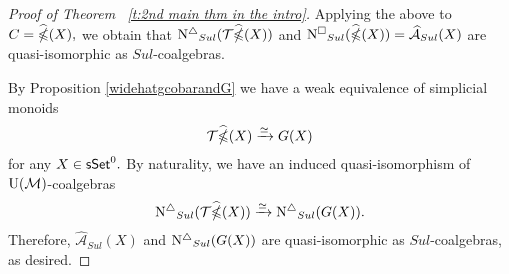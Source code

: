 \begin{proof}[Proof of Theorem ~\ref{t:2nd main thm in the intro}]
Applying the above to $C= \widehat{\operatorname{\mathbb{\Omega}}}(X),$ we obtain that $\operatorname{N^{\triangle}}_{Sul} (\mathcal{T} \widehat{\operatorname{\mathbb{\Omega}}}(X))$ and $\operatorname{N^{\square}}_{Sul}(\widehat{\operatorname{\mathbb{\Omega}}}(X)) = \widehat{\mathcal{A}}_{Sul}(X)$ are quasi-isomorphic as $Sul$-coalgebras. 

By Proposition \ref{widehatgcobarandG} we have a weak equivalence of simplicial monoids
$$\mathcal{T}\widehat{\operatorname{\mathbb{\Omega}}}(X) \xrightarrow{\simeq} G(X)$$ for any $X \in \mathsf{sSet}^0.$ By naturality, we have an induced quasi-isomorphism of ${\mathrm{U}(\mathcal{M})}$-coalgebras
$$\operatorname{N^{\triangle}}_{Sul}(\mathcal{T}\widehat{\operatorname{\mathbb{\Omega}}}(X)) \xrightarrow{\simeq} \operatorname{N^{\triangle}}_{Sul}(G(X)).$$
Therefore, $\widehat{\mathcal{A}}_{Sul}(X)$ and $\operatorname{N^{\triangle}}_{Sul}(G(X))$ are quasi-isomorphic as $Sul$-coalgebras, as desired. 




\end{proof}